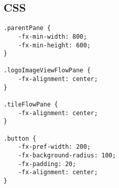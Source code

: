 \pagebreak
\subsection{CSS}
\thispagestyle{fancy}
\begin{lstlisting}[caption=PreviewDatabase.css]
.parentPane {
    -fx-min-width: 800;
    -fx-min-height: 600;
}

.logoImageViewFlowPane {
    -fx-alignment: center;
}

.tileFlowPane {
    -fx-alignment: center;
}

.button {
    -fx-pref-width: 200;
    -fx-background-radius: 100;
    -fx-padding: 20;
    -fx-alignment: center;
}

\end{lstlisting}


